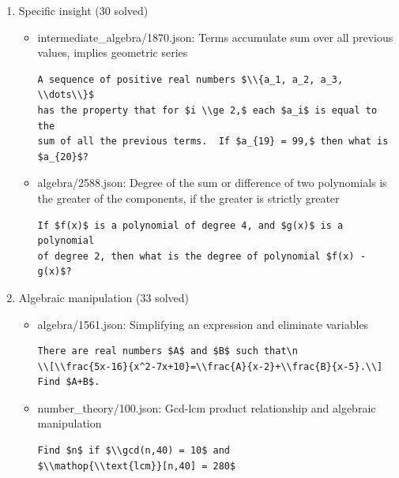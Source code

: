 \documentclass[11pt,a4paper]{article}
\begin{document}
\begin{enumerate}
  \item Specific insight (30 solved)
    \begin{itemize}
      \item intermediate\_algebra/1870.json: Terms accumulate sum over all previous values, implies geometric series
\begin{verbatim}
A sequence of positive real numbers $\\{a_1, a_2, a_3, \\dots\\}$
has the property that for $i \\ge 2,$ each $a_i$ is equal to the
sum of all the previous terms.  If $a_{19} = 99,$ then what is $a_{20}$?
\end{verbatim}
      \item algebra/2588.json: Degree of the sum or difference of two polynomials is the greater of the components, if the greater is strictly greater
\begin{verbatim}
If $f(x)$ is a polynomial of degree 4, and $g(x)$ is a polynomial
of degree 2, then what is the degree of polynomial $f(x) - g(x)$?
\end{verbatim}
    \end{itemize}

  \item Algebraic manipulation (33 solved)
    \begin{itemize}
      \item algebra/1561.json: Simplifying an expression and eliminate variables
\begin{verbatim}
There are real numbers $A$ and $B$ such that\n
\\[\\frac{5x-16}{x^2-7x+10}=\\frac{A}{x-2}+\\frac{B}{x-5}.\\]
Find $A+B$.
\end{verbatim}
      \item number\_theory/100.json: Gcd-lcm product relationship and algebraic manipulation
\begin{verbatim}
Find $n$ if $\\gcd(n,40) = 10$ and
$\\mathop{\\text{lcm}}[n,40] = 280$
\end{verbatim}
    \end{itemize}


\end{enumerate}
\end{document}
